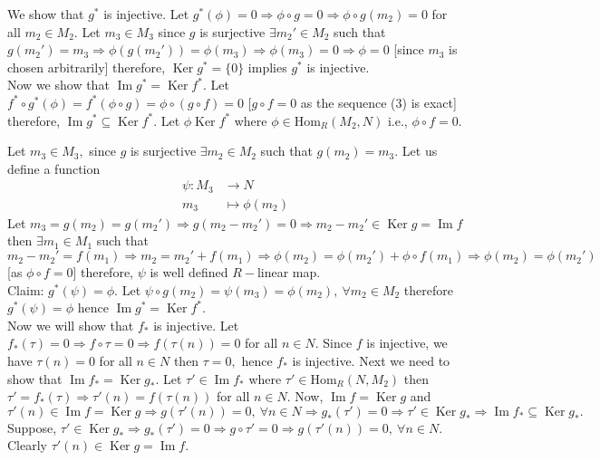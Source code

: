 \documentclass[11pt]{amsart}
\newcommand{\Hom}[1]{\text{Hom}_R\left(#1\right)}
\DeclareMathOperator{\im}{\text{Im}}
\DeclareMathOperator{\Ker}{\text{Ker}}
\begin{document}
\proof We show that $g^*$ is injective. Let $g^*(\phi)=0 \Rightarrow \phi \circ g=0 \Rightarrow \phi \circ g(m_2)=0$ for all $m_2\in M_2.$ Let $m_3\in M_3$ since $g$ is surjective $\exists m_2'\in M_2$ such that $g(m_2')=m_3 \Rightarrow \phi(g(m_2'))=\phi(m_3) \Rightarrow \phi(m_3)=0 \Rightarrow \phi =0$ [since $m_3$ is chosen arbitrarily] therefore, $\Ker g^*=\{0\}$ implies $g^*$ is injective.\\
Now we show that $\im g^*=\Ker f^*.$ Let $f^*\circ g^*(\phi)=f^*(\phi \circ g)=\phi\circ (g\circ f)=0$ [$g\circ f=0$ as the sequence (3) is exact] therefore, $\im g^*\subseteq \Ker f^*.$ Let $\phi \Ker f^*$ where $\phi \in \Hom{M_2,N}$ i.e.,  $\phi \circ f=0.$
\begin{center}
\end{center}
Let $m_3\in M_3,$ since $g$ is surjective $\exists m_2\in M_2$ such that $g(m_2)=m_3.$ Let us define a function \begin{align*}
\psi:M_3&\to N\\
m_3&\mapsto \phi (m_2)
\end{align*}
Let $m_3=g(m_2)=g(m_2') \Rightarrow g(m_2-m_2')=0 \Rightarrow m_2-m_2' \in \Ker g=\im f$ then $\exists m_1\in M_1$ such that $m_2-m_2' =f(m_1) \Rightarrow m_2=m_2'+f(m_1) \Rightarrow \phi(m_2)=\phi(m_2')+\phi \circ f(m_1) \Rightarrow \phi(m_2)=\phi(m_2')$ [as $\phi \circ f=0$]
therefore, $\psi$ is well defined $R-$linear map. \\
Claim: $g^*(\psi)=\phi.$ Let $\psi \circ g(m_2)=\psi(m_3)=\phi(m_2),~\forall m_2\in M_2$ therefore $g^*(\psi)=\phi$ hence $\im g^*=\Ker f^*.$ \\
Now we will show that $f_*$ is injective. Let $f_*(\tau)=0 \Rightarrow f \circ \tau =0  \Rightarrow f(\tau (n))=0$ for all $n\in N.$ Since $f$ is injective, we have $\tau (n)=0$ for all $n\in N$ then $\tau =0,$ hence $f_*$ is injective. Next we need to show that $\im f_*=\Ker g_*.$ Let $\tau' \in \im f_*$ where $\tau' \in \Hom{N,M_2}$ then $\tau'=f_*(\tau) \Rightarrow \tau'(n)=f(\tau(n))$ for all $n\in N.$ Now, $\im f=\Ker g$ and $\tau'(n)\in \im f=\Ker g \Rightarrow g(\tau'(n))=0,~\forall n\in N \Rightarrow g_*(\tau')=0 \Rightarrow \tau' \in \Ker g_* \Rightarrow \im f_*\subseteq \Ker g_*.$ Suppose, $\tau' \in \Ker g_* \Rightarrow g_*(\tau')=0 \Rightarrow g \circ \tau' =0 \Rightarrow g(\tau'(n))=0,~\forall n\in N.$ Clearly $\tau'(n)\in \Ker g=\im f.$\\
\end{document}
